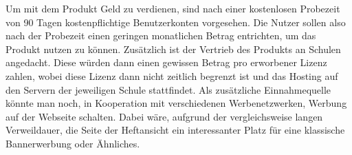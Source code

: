 \newpage

Um mit dem Produkt Geld zu verdienen, sind nach einer kostenlosen Probezeit von 90 Tagen kostenpflichtige Benutzerkonten vorgesehen. Die Nutzer sollen also nach der Probezeit einen geringen monatlichen Betrag entrichten, um das Produkt nutzen zu können. Zusätzlich ist der Vertrieb des Produkts an Schulen angedacht. Diese würden dann einen gewissen Betrag pro erworbener Lizenz zahlen, wobei diese Lizenz dann nicht zeitlich begrenzt ist und das Hosting auf den Servern der jeweiligen Schule stattfindet. Als zusätzliche Einnahmequelle könnte man noch, in Kooperation mit verschiedenen Werbenetzwerken, Werbung auf der Webseite schalten. Dabei wäre, aufgrund der vergleichsweise langen Verweildauer, die Seite der Heftansicht ein interessanter Platz für eine klassische Bannerwerbung oder Ähnliches.

